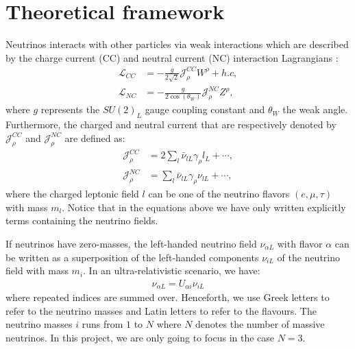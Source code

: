 \documentclass[twocolumn,secnumarabic,amssymb, nobibnotes, aps, prd,10pt]{revtex4-1}
\begin{document}
\section{Theoretical framework}
\label{sec:theory}

Neutrinos interacts with other particles via weak interactions which are described
by the charge current (CC) and neutral current (NC) interaction Lagrangians 
\cite{Bilenky:1998dt}:
\begin{align}
\mathcal{L}_{CC} &= - \frac{g}{2 \sqrt{2}} \mathcal{J}^{CC}_\rho W^\rho + h.c, \\
\mathcal{L}_{NC} &= - \frac{g}{2 \cos(\theta_W)} \mathcal{J}^{NC}_\rho Z^\rho,
\end{align}
where $g$ represents the $SU(2)_L$ gauge coupling constant and $\theta_W$ the weak
angle. Furthermore, the charged and neutral current that are respectively denoted
by $\mathcal{J}^{CC}_\rho$ and $\mathcal{J}^{NC}_\rho$ are defined as:
\begin{align}
\mathcal{J}^{CC}_\rho &= 2 \sum_{l} \bar{\nu}_{lL} \gamma_\rho l_L + \cdots, \\
\mathcal{J}^{NC}_\rho &= \sum_{l} \bar{\nu}_{lL} \gamma_\rho \nu_{lL} + \cdots,
\end{align}
where the charged leptonic field $l$ can be one of the neutrino flavors $(e, \mu, \tau)$
with mass $m_l$. Notice that in the equations above we have only written explicitly terms containing the neutrino
fields.

If neutrinos have zero-masses, the left-handed neutrino field $\nu_{\alpha L}$
with flavor $\alpha$ can be written as a superposition of the left-handed components
$\nu_{iL}$ of the neutrino field with mass $m_i$. In an ultra-relativistic scenario, we
have:
\begin{align}
\nu_{\alpha L} = U_{\alpha i} \nu_{i L}
\label{eq:superposition}
\end{align} 
where repeated indices are summed over. Henceforth, we use Greek letters to refer to
the neutrino masses and Latin letters to refer to the flavours. The neutrino masses
$i$ runs from $1$ to $N$ where $N$ denotes the number of massive neutrinos. In this
project, we are only going to focus in the case $N=3$.
\end{document}
